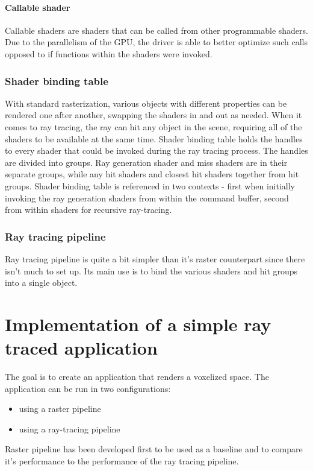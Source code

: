\documentclass[times, utf8, zavrsni, numeric]{fer}
\begin{document}
\subsubsection{Callable shader}
Callable shaders are shaders that can be called from other programmable shaders. Due to the parallelism of the GPU, the driver is able to better optimize such calls opposed to if functions within the shaders were invoked.

\subsection{Shader binding table}
With standard rasterization, various objects with different properties can be rendered one after another, swapping the shaders in and out as needed. When it comes to ray tracing, the ray can hit any object in the scene, requiring all of the shaders to be available at the same time. Shader binding table holds the handles to every shader that could be invoked during the ray tracing process. The handles are divided into groups. Ray generation shader and miss shaders are in their separate groups, while any hit shaders and closest hit shaders together from hit groups. Shader binding table is referenced in two contexts - first when initially invoking the ray generation shaders from within the command buffer, second from within shaders for recursive ray-tracing.

\subsection{Ray tracing pipeline}
Ray tracing pipeline is quite a bit simpler than it's raster counterpart since there isn't much to set up. Its main use is to bind the various shaders and hit groups into a single object.


\chapter{Implementation of a simple ray traced application}
The goal is to create an application that renders a voxelized space. The application can be run in two configurations:
\begin{itemize}
\item using a raster pipeline
\item using a ray-tracing pipeline
\end{itemize}

Raster pipeline has been developed first to be used as a baseline and to compare it's performance to the performance of the ray tracing pipeline.
\end{document}
